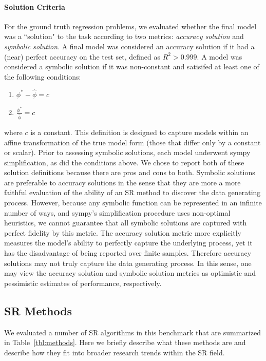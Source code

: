 \paragraph{Solution Criteria}
For the ground truth regression problems, we evaluated whether the final model was a ``solution" to the task according to two metrics: \textit{accuracy solution} and \textit{symbolic solution}. 
A final model was considered an accuracy solution if it had a (near) perfect accuracy on the test set, defined as $R^2>0.999$. 
A model was considered a symbolic solution if it was non-constant and satisifed at least one of the following conditions: 

\begin{enumerate}
    \item $\phi^*-\hat{\phi} = c $
    \item $\frac{\phi^*}{\hat{\phi}} = c $ 
\end{enumerate}

where $c$ is a constant. 
This definition is designed to capture models within an affine transformation of the true model form (those that differ only by a constant or scalar). 
Prior to assessing symbolic solutions, each model underwent sympy simplification, as did the conditions above. 
We chose to report both of these solution definitions because there are pros and cons to both. 
Symbolic solutions are preferable to accuracy solutions in the sense that they are more a more faithful evaluation of the ability of an SR method to discover the data generating process.
However, because any symbolic function can be represented in an infinite number of ways, and sympy's simplification procedure uses non-optimal heuristics, we cannot guarantee that all symbolic solutions are captured with perfect fidelity by this metric. 
The accuracy solution metric more explicitly measures the model's ability to perfectly capture the underlying process, yet it has the disadvantage of being reported over finite samples. 
Therefore accuracy solutions may not truly capture the data generating process. 
In this sense, one may view the accuracy solution and symbolic solution metrics as optimistic and pessimistic estimates of performance, respectively.

\subsection{SR Methods}

We evaluated a number of SR algorithms in this benchmark that are summarized in Table~\ref{tbl:methods}.
Here we briefly describe what these methods are and describe how they fit into broader research trends within the SR field. 

